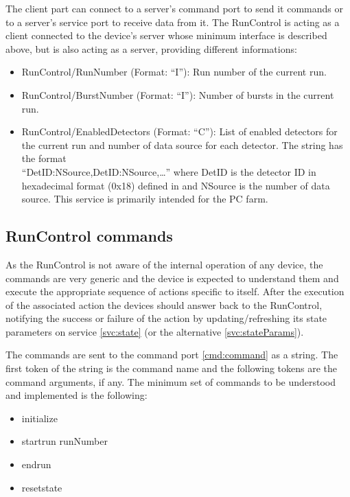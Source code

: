\documentclass[a4paper]{article}
\begin{document}
The client part can connect to a server's command port to send it commands or to a server's
service port to receive data from it. The RunControl is acting as a client connected to the device's
server whose minimum interface is described above, but is also acting as a server, providing different informations:
\begin{itemize}
	\item RunControl/RunNumber (Format: ``I''): Run number of the current run.
	\item RunControl/BurstNumber (Format: ``I''): Number of bursts in the current run.
	\item RunControl/EnabledDetectors (Format: ``C''): List of enabled detectors for the current run
	and number of data source for each detector. The string has the format\\ 
	\mbox{``DetID:NSource,DetID:NSource,\ldots''} where DetID is the detector ID in hexadecimal format
	(0x18) defined in \cite{biblio:TDAQNote} and NSource is the number of data source. This
	service is primarily intended for the PC farm.
\end{itemize}

\subsection{RunControl commands}\label{sec:commands}

As the RunControl is not aware of the internal operation of any device, the commands are very
generic and the device is expected to understand them and execute the appropriate sequence of actions
specific to itself. After the execution of the associated action the devices should answer back to
the RunControl, notifying the success or failure of the action by updating/refreshing its state
parameters on service \ref{svc:state} (or the alternative \ref{svc:stateParams}).

The commands are sent to the command port \ref{cmd:command} as a string. The first token of the
string is the command name and the following tokens are the command arguments, if any. The minimum
set of commands to be understood and implemented is the following:
\begin{itemize}
	\item initialize
	\item startrun runNumber
	\item endrun
	\item resetstate
\end{itemize}
\end{document}
